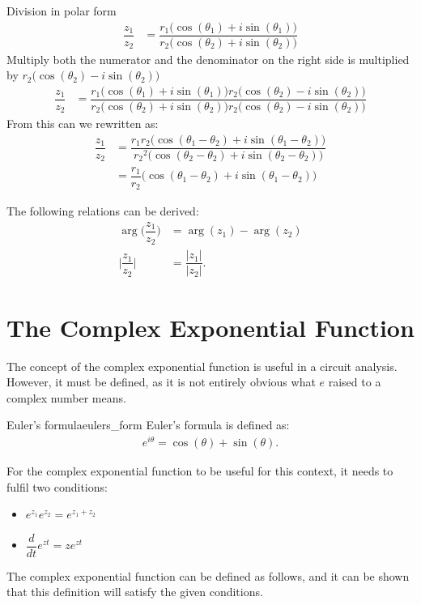 \begin{prof}{Division in polar form}{}
\begin{align}
\dfrac{z_1}{z_2}&=\dfrac{r_1\Big(\cos(\theta_1)+i\sin(\theta_1)\Big)}{r_2\Big(\cos(\theta_2)+i\sin(\theta_2)\Big)}
\end{align}
Multiply both the numerator and the denominator on the right side is multiplied by $r_2\Big(\cos(\theta_2)-i\sin(\theta_2)\Big)$
\begin{align}
\dfrac{z_1}{z_2}&=\dfrac{r_1\Big(\cos(\theta_1)+i\sin(\theta_1)\Big)r_2\Big(\cos(\theta_2)-i\sin(\theta_2)\Big)}{r_2\Big(\cos(\theta_2)+i\sin(\theta_2)\Big)r_2\Big(\cos(\theta_2)-i\sin(\theta_2)\Big)}
\end{align}
From  this can we rewritten as:
\begin{align}
\dfrac{z_1}{z_2}&=\dfrac{r_1r_2\Big(\cos(\theta_1-\theta_2)+i\sin(\theta_1-\theta_2)\Big)}{{r_2}^2\Big(\cos(\theta_2-\theta_2)+i\sin(\theta_2-\theta_2)\Big)}
\\
&=\dfrac{r_1}{r_2}\Big( \cos(\theta_1-\theta_2)+ i \sin(\theta_1-\theta_2)\Big)
\end{align}
\end{prof}

The following relations can be derived:
\begin{align}
\arg\Big(\dfrac{z_1}{z_2}\Big)&=\arg(z_1)-\arg(z_2)
\\
\Big|\dfrac{z_1}{z_2}\Big|&=\dfrac{|z_1|}{|z_2|}. \label{eq:mod_div}
\end{align}

\section{The Complex Exponential Function}
The concept of the complex exponential function is useful in a circuit analysis. However, it must be defined, as it is not entirely obvious what $e$ raised to a complex number means.

\begin{definition}{Euler's formula}{eulers_form}
Euler's formula is defined as:
\begin{align}
e^{i\theta}=\cos(\theta)+\sin(\theta).
\end{align} 
\end{definition}

\noindent For the complex exponential function to be useful for this context, it needs to fulfil two conditions:
\begin{itemize}
	\item $e^{z_1}e^{z_2} = e^{z_1 + z_2}$
	\item $\dfrac{d}{dt}e^{zt} = ze^{zt}$
\end{itemize}
The complex exponential function can be defined as follows, and it can be shown that this definition will satisfy the given conditions.

